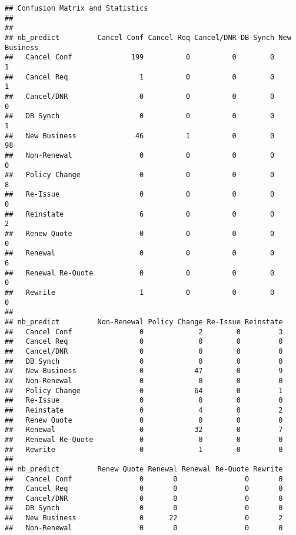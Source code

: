 \documentclass[]{article}
\begin{document}
\begin{verbatim}
## Confusion Matrix and Statistics
## 
##                   
## nb_predict         Cancel Conf Cancel Req Cancel/DNR DB Synch New Business
##   Cancel Conf              199          0          0        0            1
##   Cancel Req                 1          0          0        0            1
##   Cancel/DNR                 0          0          0        0            0
##   DB Synch                   0          0          0        0            1
##   New Business              46          1          0        0           98
##   Non-Renewal                0          0          0        0            0
##   Policy Change              0          0          0        0            8
##   Re-Issue                   0          0          0        0            0
##   Reinstate                  6          0          0        0            2
##   Renew Quote                0          0          0        0            0
##   Renewal                    0          0          0        0            6
##   Renewal Re-Quote           0          0          0        0            0
##   Rewrite                    1          0          0        0            0
##                   
## nb_predict         Non-Renewal Policy Change Re-Issue Reinstate
##   Cancel Conf                0             2        0         3
##   Cancel Req                 0             0        0         0
##   Cancel/DNR                 0             0        0         0
##   DB Synch                   0             0        0         0
##   New Business               0            47        0         9
##   Non-Renewal                0             0        0         0
##   Policy Change              0            64        0         1
##   Re-Issue                   0             0        0         0
##   Reinstate                  0             4        0         2
##   Renew Quote                0             0        0         0
##   Renewal                    0            32        0         7
##   Renewal Re-Quote           0             0        0         0
##   Rewrite                    0             1        0         0
##                   
## nb_predict         Renew Quote Renewal Renewal Re-Quote Rewrite
##   Cancel Conf                0       0                0       0
##   Cancel Req                 0       0                0       0
##   Cancel/DNR                 0       0                0       0
##   DB Synch                   0       0                0       0
##   New Business               0      22                0       2
##   Non-Renewal                0       0                0       0

\end{verbatim}
\end{document}
